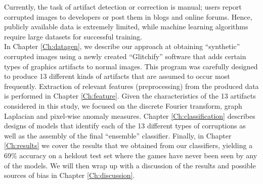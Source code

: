 \noindent
Currently, the task of artifact detection or correction is manual; users report corrupted images to developers or post them in blogs and online forums. Hence, publicly available data is extremely limited, while machine learning algorithms require large datasets for successful training. \\

\noindent In Chapter \ref{Ch:datagen}, we describe our approach at obtaining ``synthetic'' corrupted images using a newly created ``Glitchify'' software that adds certain types of graphics artifacts to normal images. This program was carefully designed to produce 13 different kinds of artifacts that are assumed to occur most frequently. Extraction of relevant features (preprocessing) from the produced data is performed in Chapter \ref{Ch:feature}. Given the characteristics of the 13 artifacts considered in this study, we focused on the discrete Fourier transform, graph Laplacian and pixel-wise anomaly measures. Chapter \ref{Ch:classification} describes designs of models that identify each of the 13 different types of corruptions as well as the assembly of the final ``ensemble'' classifier. Finally, in Chapter \ref{Ch:results} we cover the results that we obtained from our classifiers, yielding a 69\% accuracy on a heldout test set where the games have never been seen by any of the models. We will then wrap up with a discussion of the results and possible sources of bias in Chapter \ref{Ch:discussion}.


\endinput
